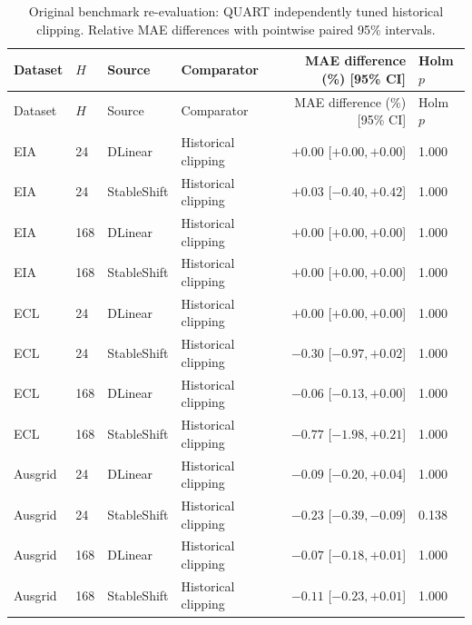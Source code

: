 \begin{longtable}{lllp{}rp{}}
\caption{Original benchmark re-evaluation: QUART independently tuned historical clipping. Relative MAE differences with pointwise paired 95\% intervals.}\label{tab:test_independently_tuned_history}\\
\toprule
Dataset & $H$ & Source & Comparator & MAE difference (\%) [95\% CI] & Holm $p$\\
\midrule
\endfirsthead
\toprule
Dataset & $H$ & Source & Comparator & MAE difference (\%) [95\% CI] & Holm $p$\\
\midrule
\endhead
EIA & 24 & DLinear & Historical clipping & $+0.00$ [$ +0.00, +0.00 $] & 1.000\\
EIA & 24 & StableShift & Historical clipping & $+0.03$ [$ -0.40, +0.42 $] & 1.000\\
EIA & 168 & DLinear & Historical clipping & $+0.00$ [$ +0.00, +0.00 $] & 1.000\\
EIA & 168 & StableShift & Historical clipping & $+0.00$ [$ +0.00, +0.00 $] & 1.000\\
ECL & 24 & DLinear & Historical clipping & $+0.00$ [$ +0.00, +0.00 $] & 1.000\\
ECL & 24 & StableShift & Historical clipping & $-0.30$ [$ -0.97, +0.02 $] & 1.000\\
ECL & 168 & DLinear & Historical clipping & $-0.06$ [$ -0.13, +0.00 $] & 1.000\\
ECL & 168 & StableShift & Historical clipping & $-0.77$ [$ -1.98, +0.21 $] & 1.000\\
Ausgrid & 24 & DLinear & Historical clipping & $-0.09$ [$ -0.20, +0.04 $] & 1.000\\
Ausgrid & 24 & StableShift & Historical clipping & $-0.23$ [$ -0.39, -0.09 $] & 0.138\\
Ausgrid & 168 & DLinear & Historical clipping & $-0.07$ [$ -0.18, +0.01 $] & 1.000\\
Ausgrid & 168 & StableShift & Historical clipping & $-0.11$ [$ -0.23, +0.01 $] & 1.000\\
\bottomrule
\end{longtable}
